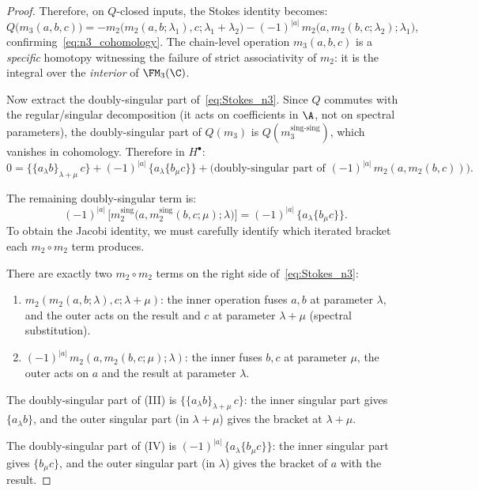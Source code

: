 \begin{proof}
Therefore, on $Q$-closed inputs, the Stokes identity becomes:
\begin{equation}
Q\bigl(m_3(a,b,c)\bigr) = -m_2\!\bigl(m_2(a,b;\lambda_1),c;\lambda_1{+}\lambda_2\bigr) - (-1)^{|a|}\, m_2\!\bigl(a,m_2(b,c;\lambda_2);\lambda_1\bigr),
\end{equation}
confirming~\eqref{eq:n3_cohomology}. The chain-level operation $m_3(a,b,c)$ is a \emph{specific} homotopy witnessing the failure of strict associativity of $m_2$: it is the integral over the \emph{interior} of $\FM_3(\C)$.

Now extract the doubly-singular part of~\eqref{eq:Stokes_n3}. Since $Q$ commutes with the regular/singular decomposition (it acts on coefficients in $\A$, not on spectral parameters), the doubly-singular part of $Q(m_3)$ is $Q(m_3^{\mathrm{sing\text{-}sing}})$, which vanishes in cohomology. Therefore in $H^\bullet$:
\begin{equation}
0 = \{\{a_\lambda b\}_{\lambda+\mu}\, c\} + (-1)^{|a|}\,\{a_\lambda \{b_\mu c\}\} + \bigl(\text{doubly-singular part of } (-1)^{|a|}\, m_2(a,m_2(b,c))\bigr).
\end{equation}

The remaining doubly-singular term is:
\[
(-1)^{|a|}\,\bigl[m_2^{\mathrm{sing}}\bigl(a,m_2^{\mathrm{sing}}(b,c;\mu);\lambda\bigr)\bigr]
= (-1)^{|a|}\, \{a_\lambda \{b_\mu c\}\}.
\]
To obtain the Jacobi identity, we must carefully identify which iterated bracket each $m_2 \circ m_2$ term produces.

There are exactly two $m_2 \circ m_2$ terms on the right side of~\eqref{eq:Stokes_n3}:
\begin{enumerate}
\item[(III)] $m_2(m_2(a,b;\lambda),c;\lambda{+}\mu)$: the inner operation fuses $a,b$ at parameter $\lambda$, and the outer acts on the result and $c$ at parameter $\lambda+\mu$ (spectral substitution).
\item[(IV)] $(-1)^{|a|}\,m_2(a,m_2(b,c;\mu);\lambda)$: the inner fuses $b,c$ at parameter $\mu$, the outer acts on $a$ and the result at parameter $\lambda$.
\end{enumerate}

The doubly-singular part of (III) is $\{\{a_\lambda b\}_{\lambda+\mu}\, c\}$: the inner singular part gives $\{a_\lambda b\}$, and the outer singular part (in $\lambda+\mu$) gives the bracket at $\lambda+\mu$.

The doubly-singular part of (IV) is $(-1)^{|a|}\,\{a_\lambda \{b_\mu c\}\}$: the inner singular part gives $\{b_\mu c\}$, and the outer singular part (in $\lambda$) gives the bracket of $a$ with the result.


\end{proof}
